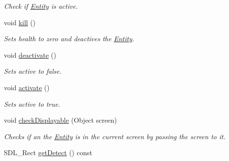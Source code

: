 \begin{DoxyCompactItemize}
\begin{DoxyCompactList}\small\item\em Check if \hyperlink{classEntity}{Entity} is active. \end{DoxyCompactList}\item 
void \hyperlink{classEntity_a522648b330daab91b49f78f0737a943f}{kill} ()\hypertarget{classEntity_a522648b330daab91b49f78f0737a943f}{}\label{classEntity_a522648b330daab91b49f78f0737a943f}

\begin{DoxyCompactList}\small\item\em Sets health to zero and deactives the \hyperlink{classEntity}{Entity}. \end{DoxyCompactList}\item 
void \hyperlink{classEntity_aa409e70e0f5abb2ac1314f8745b9a661}{deactivate} ()\hypertarget{classEntity_aa409e70e0f5abb2ac1314f8745b9a661}{}\label{classEntity_aa409e70e0f5abb2ac1314f8745b9a661}

\begin{DoxyCompactList}\small\item\em Sets active to false. \end{DoxyCompactList}\item 
void \hyperlink{classEntity_a95079be1c9fa9f109dd3cf7446eeeb1d}{activate} ()\hypertarget{classEntity_a95079be1c9fa9f109dd3cf7446eeeb1d}{}\label{classEntity_a95079be1c9fa9f109dd3cf7446eeeb1d}

\begin{DoxyCompactList}\small\item\em Sets active to true. \end{DoxyCompactList}\item 
void \hyperlink{classEntity_a63aac9638f79f0608b08f28b8cdc718e}{check\+Displayable} (Object screen)\hypertarget{classEntity_a63aac9638f79f0608b08f28b8cdc718e}{}\label{classEntity_a63aac9638f79f0608b08f28b8cdc718e}

\begin{DoxyCompactList}\small\item\em Checks if an the \hyperlink{classEntity}{Entity} is in the current screen by passing the screen to it. \end{DoxyCompactList}\item 
S\+D\+L\+\_\+\+Rect \hyperlink{classEntity_a62073e91ee6f63f4b9a7e1512cda2e46}{get\+Detect} () const \hypertarget{classEntity_a62073e91ee6f63f4b9a7e1512cda2e46}{}\label{classEntity_a62073e91ee6f63f4b9a7e1512cda2e46}


\end{DoxyCompactItemize}
